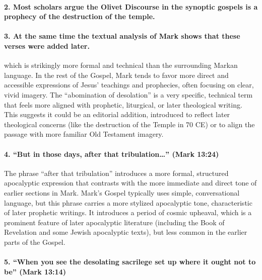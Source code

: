 \paragraph{2.
Most scholars argue the Olivet Discourse in the synoptic gospels is a prophecy of the destruction of the temple.}\label{par:most-scholars-argue-the-olivet-discourse-in-the-synoptic-gospels-is-a-prophecy-of-the-destruction-of-the-temple.}

\paragraph{3.
At the same time the textual analysis of Mark shows that these verses were added later.}\label{par:at-the-same-time-the-textual-analysis-of-mark-shows-that-these-verses-were-added-later.}

which is strikingly more formal and technical than the surrounding Markan language.
In the rest of the Gospel, Mark tends to favor more direct and accessible expressions of Jesus' teachings and prophecies, often focusing on clear, vivid imagery.
The ``abomination of desolation'' is a very specific, technical term that feels more aligned with prophetic, liturgical, or later theological writing.
This suggests it could be an editorial addition, introduced to reflect later theological concerns (like the destruction of the Temple in 70 CE) or to align the passage with more familiar Old Testament imagery.

\paragraph{\texorpdfstring{4.
``But in those days, after that tribulation\ldots{}'' (Mark 13:24)}{4.
``But in those days, after that tribulation\ldots'' (Mark 13:24)}}\label{par:but-in-those-days-after-that-tribulation-mark-1324}

The phrase ``after that tribulation'' introduces a more formal, structured apocalyptic expression that contrasts with the more immediate and direct tone of earlier sections in Mark.
Mark's Gospel typically uses simple, conversational language, but this phrase carries a more stylized apocalyptic tone, characteristic of later prophetic writings.
It introduces a period of cosmic upheaval, which is a prominent feature of later apocalyptic literature (including the Book of Revelation and some Jewish apocalyptic texts), but less common in the earlier parts of the Gospel.

\paragraph{5.
``When you see the desolating sacrilege set up where it ought not to be'' (Mark 13:14)}\label{par:when-you-see-the-desolating-sacrilege-set-up-where-it-ought-not-to-be-mark-1314}

